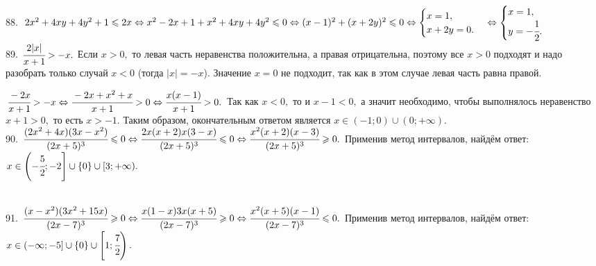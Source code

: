 \documentclass[12pt]{article}
\begin{document}
88. $2x^2+4xy+4y^2+1\leqslant 2x\Leftrightarrow x^2-2x+1+x^2+4xy+4y^2\leqslant0
\Leftrightarrow (x-1)^2+(x+2y)^2\leqslant0 \Leftrightarrow \begin{cases} x=1,\\ x+2y=0.\end{cases} \Leftrightarrow \begin{cases} x=1,\\ y=-\cfrac{1}{2}.\end{cases}$\\
89.  $\cfrac{2|x|}{x+1}>-x.$ Если $x>0,$ то левая часть неравенства положительна, а правая отрицательна, поэтому все $x>0$ подходят и надо разобрать только случай $x<0$ (тогда $|x|=-x$). Значение $x=0$ не подходит, так как в этом случае левая часть равна правой.

$\cfrac{-2x}{x+1}>-x\Leftrightarrow \cfrac{-2x+x^2+x}{x+1}>0\Leftrightarrow \cfrac{x(x-1)}{x+1}>0.$ Так как $x<0,$ то и $x-1<0,$ а значит необходимо, чтобы выполнялось неравенство $x+1>0,$ то есть $x>-1.$ Таким образом, окончательным ответом является $x\in(-1;0)\cup (0;+\infty).$\\
90. $\cfrac{(2x^2+4x)(3x-x^2)}{(2x+5)^3}\leqslant 0\Leftrightarrow
\cfrac{2x(x+2)x(3-x)}{(2x+5)^3}\leqslant0\Leftrightarrow
\cfrac{x^2(x+2)(x-3)}{(2x+5)^3}\geqslant0.$ Применив метод интервалов, найдём ответ: $x\in\left(-\cfrac{5}{2};-2\right]\cup\{0\}\cup[3;+\infty).$
\begin{figure}[ht!]
\end{figure}\\
91. $\cfrac{(x-x^2)(3x^2+15x)}{(2x-7)^3}\geqslant 0\Leftrightarrow
\cfrac{x(1-x)3x(x+5)}{(2x-7)^3}\geqslant0\Leftrightarrow
\cfrac{x^2(x+5)(x-1)}{(2x-7)^3}\leqslant0.$ Применив метод интервалов, найдём ответ: $x\in\left(-\infty;-5\right]\cup\{0\}\cup\left[1;\cfrac{7}{2}\right).$
\begin{figure}[ht!]
\end{figure}\\
\end{document}

